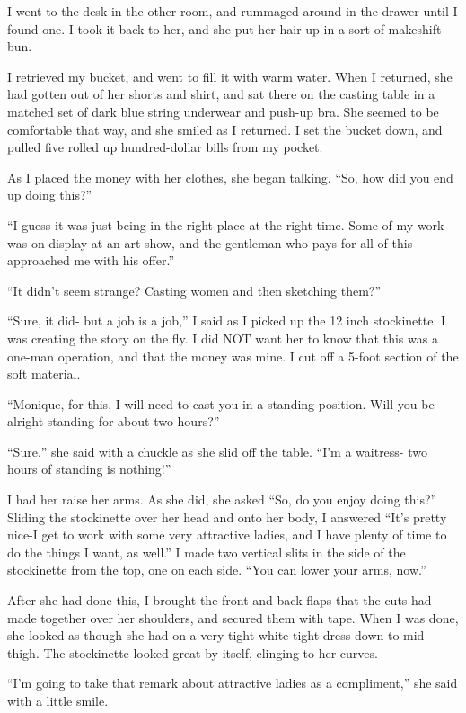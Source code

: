 I went to the desk in the other room, and rummaged around in the drawer until I found one. I
took it back to her, and she put her hair up in a sort of makeshift bun.

I retrieved my bucket, and went to fill it with warm water. When I returned, she had gotten
out of her shorts and shirt, and sat there on the casting table in a matched set of dark blue
string underwear and push-up bra. She seemed to be comfortable that way, and she smiled as I
returned. I set the bucket down, and pulled five rolled up hundred-dollar bills from my pocket.

As I placed the money with her clothes, she began talking. ``So, how did you end up doing
this?''

``I guess it was just being in the right place at the right time. Some of my work was on
display at an art show, and the gentleman who pays for all of this approached me with his
offer.''

``It didn't seem strange? Casting women and then sketching them?''

``Sure, it did- but a job is a job,'' I said as I picked up the 12 inch stockinette. I was
creating the story on the fly. I did NOT want her to know that this was a one-man operation, and
that the money was mine. I cut off a 5-foot section of the soft material.

``Monique, for this, I will need to cast you in a standing position. Will you be alright
standing for about two hours?''

``Sure,'' she said with a chuckle as she slid off the table. ``I'm a waitress- two hours of
standing is nothing!''

I had her raise her arms. As she did, she asked ``So, do you enjoy doing this?'' Sliding the
stockinette over her head and onto her body, I answered ``It's pretty nice-I get to work with
some very attractive ladies, and I have plenty of time to do the things I want, as well.'' I
made
two vertical slits in the side of the stockinette from the top, one on each side. ``You can
lower
your arms, now.''

After she had done this, I brought the front and back flaps that the cuts had made together
over her shoulders, and secured them with tape. When I was done, she looked as though she had on
a very tight white tight dress down to mid -thigh. The stockinette looked great by itself,
clinging to her curves.

``I'm going to take that remark about attractive ladies as a compliment,'' she said with a
little smile.

